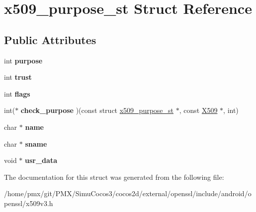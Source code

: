 \hypertarget{structx509__purpose__st}{}\section{x509\+\_\+purpose\+\_\+st Struct Reference}
\label{structx509__purpose__st}
\subsection*{Public Attributes}
\begin{DoxyCompactItemize}
\item 
\mbox{\label{structx509__purpose__st_ad1f43f5b4f7cd5114e7c987b5d485a42}} 
int {\bfseries purpose}
\item 
\mbox{\label{structx509__purpose__st_a2033355e7111f867d6727e2da3e92716}} 
int {\bfseries trust}
\item 
\mbox{\label{structx509__purpose__st_ad058e4594818ca6291ac4a69586c302b}} 
int {\bfseries flags}
\item 
\mbox{\label{structx509__purpose__st_a623ef466f6eb424201d65504686e525a}} 
int($\ast$ {\bfseries check\+\_\+purpose} )(const struct \hyperlink{structx509__purpose__st}{x509\+\_\+purpose\+\_\+st} $\ast$, const \hyperlink{structx509__st}{X509} $\ast$, int)
\item 
\mbox{\label{structx509__purpose__st_a7d47a964946ff4ab1f655bae22096615}} 
char $\ast$ {\bfseries name}
\item 
\mbox{\label{structx509__purpose__st_aca523acab1ebbe277f495b3fa3597627}} 
char $\ast$ {\bfseries sname}
\item 
\mbox{\label{structx509__purpose__st_a71cbf724aea911041748a7b7e820d27c}} 
void $\ast$ {\bfseries usr\+\_\+data}
\end{DoxyCompactItemize}


The documentation for this struct was generated from the following file\+:\begin{DoxyCompactItemize}
\item 
/home/pmx/git/\+P\+M\+X/\+Simu\+Cocos3/cocos2d/external/openssl/include/android/openssl/x509v3.\+h\end{DoxyCompactItemize}
